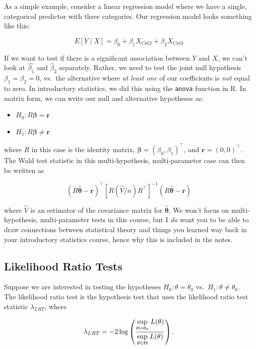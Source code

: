 \documentclass[
  letterpaper,
  DIV=11,
  numbers=noendperiod]{scrreprt}
\begin{document}
As a simple example, consider a linear regression model where we have a
single, categorical predictor with three categories. Our regression
model looks something like this:

\[
E[Y \mid X] = \beta_0 + \beta_1 X_{Cat2} + \beta_2 X_{Cat3}
\]

If we want to test if there is a significant association between \(Y\)
and \(X\), we can't look at \(\hat{\beta_1}\) and \(\hat{\beta}_2\)
separately. Rather, we need to test the joint null hypothesis
\(\beta_1 = \beta_2 = 0\), vs.~the alternative where \emph{at least one}
of our coefficients is \emph{not} equal to zero. In introductory
statistics, we did this using the \texttt{anova} function in R. In
matrix form, we can write our null and alternative hypotheses as:

\begin{itemize}
\item
  \(H_0: R \boldsymbol{\beta} = \textbf{r}\)
\item
  \(H_1: R \boldsymbol{\beta} \neq \textbf{r}\)
\end{itemize}

where \(R\) in this case is the identity matrix,
\(\boldsymbol{\beta} = (\beta_0, \beta_1)^\top\), and
\(\textbf{r} = (0,0)^\top\). The Wald test statistic in this
multi-hypothesis, multi-parameter case can then be written as

\[
(R\hat{\boldsymbol{\theta}} - \textbf{r})^\top [R (\hat{V}/n) R^\top]^{-1} (R\hat{\boldsymbol{\theta}} - \textbf{r})
\]

where \(\hat{V}\) is an estimator of the covariance matrix for
\(\hat{\boldsymbol{\theta}}\). We won't focus on multi-hypothesis,
multi-parameter tests in this course, but I \emph{do} want you to be
able to draw connections between statistical theory and things you
learned way back in your introductory statistics course, hence why this
is included in the notes.

\subsection*{Likelihood Ratio Tests}\label{likelihood-ratio-tests}

Suppose we are interested in testing the hypotheses
\(H_0: \theta = \theta_0\) vs.~\(H_1: \theta \neq \theta_0\). The
likelihood ratio test is the hypothesis test that uses the likelihood
ratio test statistic \(\lambda_{LRT}\), where

\[
\lambda_{LRT} = -2 \log\left(\frac{\underset{\theta = \theta_0}{\text{sup}} \hspace{1mm} L(\theta)}{\underset{\theta \in \Theta}{\text{sup}} \hspace{1mm} L(\theta)} \right).
\]
\end{document}
